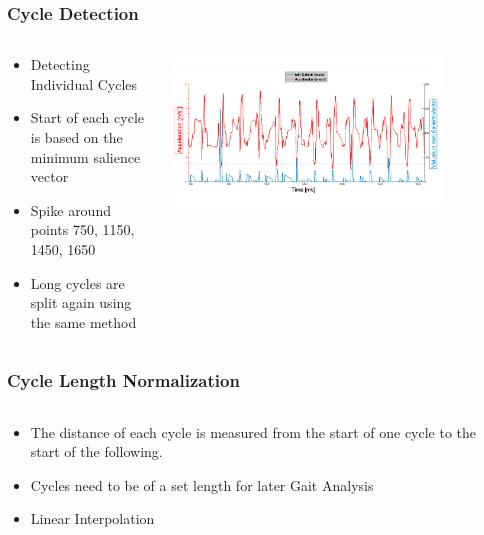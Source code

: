 \documentclass{beamer}
\begin{document}
\begin{frame}
  \frametitle{Cycle Detection}
  \begin{columns}
  \begin{column}{.5\textwidth}
  \begin{itemize}
  	\item Detecting Individual Cycles
  	\item Start of each cycle is based on the minimum salience vector
  	\item Spike around points 750, 1150, 1450, 1650 
  	\item Long cycles are split again using the same method
  \end{itemize}
  \end{column}
    \begin{column}{0.7\textwidth}
   \includegraphics[width=0.8\textwidth]{Illustrations/svector.png}
       \\
  \end{column}
  \end{columns}
\end{frame}

\begin{frame}
  \frametitle{Cycle Length Normalization}
  \begin{columns}
  \begin{column}{.6\textwidth}
  \begin{itemize}
  	\item The distance of each cycle is measured from the start of one cycle to the start of the following. 
  	\linebreak
  	\item Cycles need to be of a set length for later Gait Analysis
  	\linebreak
  	\item Linear Interpolation 
  \end{itemize}
  \end{column}
    \begin{column}{0.6\textwidth}
       \\
  \end{column}
  \end{columns}
\end{frame}
\end{document}
